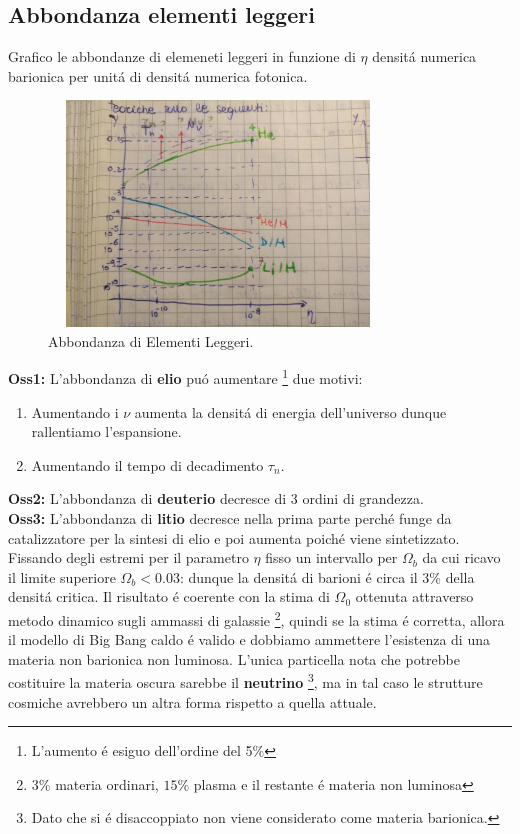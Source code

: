 \documentclass[12pt, a4paper]{article}
\begin{document}
\subsection{Abbondanza elementi leggeri}
Grafico le abbondanze di elemeneti leggeri in funzione di $\eta$ densit\'{a} numerica barionica per unit\'{a} di densit\'{a} numerica fotonica.\\
\begin{figure}[htp]
    \centering
    \includegraphics[width=9cm, height=6cm]{images/leggeri.jpeg}
    \caption{Abbondanza di Elementi Leggeri.}
    \label{fig:leggeri}
\end{figure}
\textbf{Oss1:}  L'abbondanza di \textbf{elio} pu\'{o} aumentare \footnote{L'aumento \'{e} esiguo dell'ordine del 5$\%$} due motivi:\\
\begin{enumerate}
\item  Aumentando i $\nu$ aumenta la densit\'{a} di energia dell'universo dunque rallentiamo l'espansione.
\item Aumentando il tempo di decadimento $\tau_n$.
\end{enumerate}
\textbf{Oss2:} L'abbondanza di \textbf{deuterio} decresce di 3 ordini di grandezza.\\
\textbf{Oss3:} L'abbondanza di \textbf{litio} decresce nella prima parte perch\'{e} funge da catalizzatore per la sintesi di elio e poi aumenta poich\'{e} viene sintetizzato.\\
Fissando degli estremi per il parametro $\eta$ fisso un intervallo per  $\Omega_b$ da cui ricavo il limite superiore $\Omega_b<0.03$: dunque la densit\'{a} di barioni \'{e} circa il $3\%$ della densit\'{a} critica. Il risultato \'{e} coerente con la stima di $\Omega_0$ ottenuta attraverso metodo dinamico sugli ammassi di galassie \footnote{ $3\%$ materia ordinari, $15\%$ plasma e il restante \'{e} materia non luminosa}, quindi se la stima \'{e} corretta, allora il modello di Big Bang caldo \'{e} valido e dobbiamo ammettere l'esistenza di una materia non barionica non luminosa. L'unica particella nota che potrebbe costituire la materia oscura sarebbe il \textbf{neutrino} \footnote{ Dato che si \'{e} disaccoppiato non viene considerato come materia barionica.}, ma in tal caso le strutture cosmiche avrebbero un altra forma rispetto a quella attuale.
\end{document}
